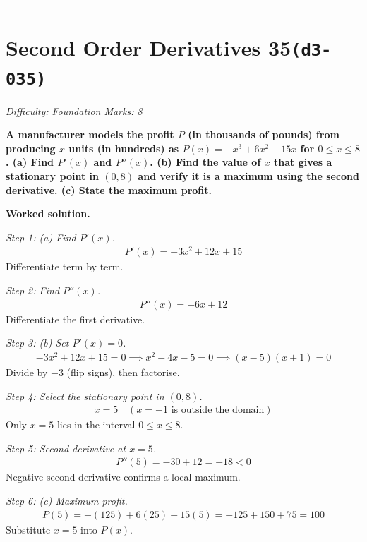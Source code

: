 \documentclass[11pt]{article}
\newcommand{\question}[1]{\par\medskip\noindent\textbf{#1}\par}
\begin{document}
\medskip\hrule

\section*{Second Order Derivatives 35\quad\small\texttt{(d3-035)}}
\textit{Difficulty: Foundation \quad\textbar\quad Marks: 8}

\question{A manufacturer models the profit \( P \) (in thousands of pounds) from producing \( x \) units (in hundreds) as \( P(x) = -x^3 + 6x^2 + 15x \) for \( 0 \leq x \leq 8 \). (a) Find \( P'(x) \) and \( P''(x) \). (b) Find the value of \( x \) that gives a stationary point in \( (0, 8) \) and verify it is a maximum using the second derivative. (c) State the maximum profit.}

\textbf{Worked solution.}

\textit{Step 1: (a) Find \( P'(x) \).}
\[\begin{gathered}
P'(x) = -3x^2 + 12x + 15
\end{gathered}\]
Differentiate term by term.

\textit{Step 2: Find \( P''(x) \).}
\[\begin{gathered}
P''(x) = -6x + 12
\end{gathered}\]
Differentiate the first derivative.

\textit{Step 3: (b) Set \( P'(x) = 0 \).}
\[\begin{gathered}
-3x^2 + 12x + 15 = 0 \implies x^2 - 4x - 5 = 0 \implies (x-5)(x+1) = 0
\end{gathered}\]
Divide by \(-3\) (flip signs), then factorise.

\textit{Step 4: Select the stationary point in \( (0, 8) \).}
\[\begin{gathered}
x = 5 \quad (x = -1 \text{ is outside the domain})
\end{gathered}\]
Only \( x = 5 \) lies in the interval \( 0 \leq x \leq 8 \).

\textit{Step 5: Second derivative at \( x = 5 \).}
\[\begin{gathered}
P''(5) = -30 + 12 = -18 < 0
\end{gathered}\]
Negative second derivative confirms a local maximum.

\textit{Step 6: (c) Maximum profit.}
\[\begin{gathered}
P(5) = -(125) + 6(25) + 15(5) = -125 + 150 + 75 = 100
\end{gathered}\]
Substitute \( x = 5 \) into \( P(x) \).
\end{document}
